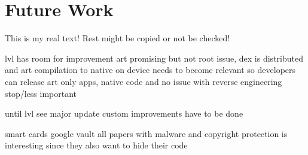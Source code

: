 \section{Future Work}\label{section:conclusion-future}
This is my real text! Rest might be copied or not be checked!


%
lvl has room for improvement
art promising but not root issue, dex is distributed and art compilation to native on device
needs to become relevant so developers can release art only apps, native code and no issue with reverse engineering stop/less important

until lvl see major update custom improvements have to be done
\cite{munteanLicense}
%

smart cards\newline
google vault\newline
all papers with malware and copyright protection is interesting since they also want to hide their code\newline
